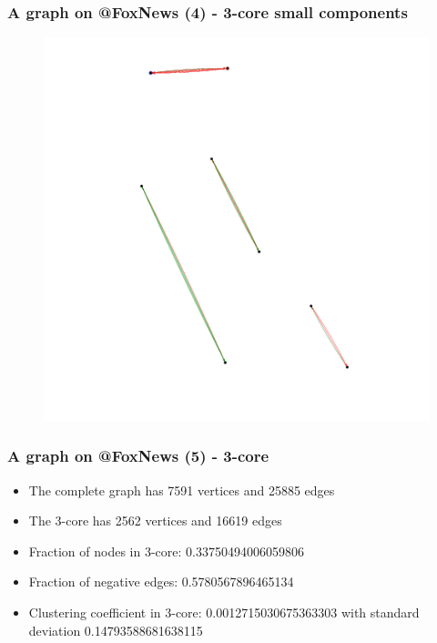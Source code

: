 \documentclass{beamer}
\begin{document}
\begin{frame}[c]
    \frametitle{A graph on @FoxNews (4) - 3-core small components}
    \begin{figure}[htpb]
        \centering
        \includegraphics[width=0.8\linewidth]{img/foxnews_20_3_small.png}
        \label{fig:img/foxnews_20_3}
    \end{figure}
\end{frame}

\begin{frame}[c]
    \frametitle{A graph on @FoxNews (5) - 3-core}
    \begin{itemize}
        \item The complete graph has 7591 vertices and 25885 edges
        \item The 3-core has 2562 vertices and 16619 edges
        \item Fraction of nodes in 3-core: 0.33750494006059806
        \item Fraction of negative edges: 0.5780567896465134
        \item Clustering coefficient in 3-core: 0.0012715030675363303 with standard deviation 0.14793588681638115
    \end{itemize}    
\end{frame}

\end{document}
